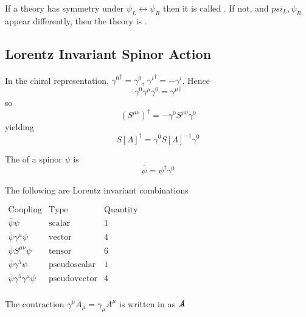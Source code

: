 \documentclass{article}
\begin{document}
\begin{definition}
If a theory has symmetry under $\psi_L \leftrightarrow \psi_R$ then it is called . If not, and $psi_L, \psi_R$ appear differently, then the theory is . 
\end{definition}

\subsection{Lorentz Invariant Spinor Action}

\begin{fact}
In the chiral representation, ${\gamma^0}^\dagger=\gamma^0$, ${\gamma^i}^\dagger=-\gamma^i$. Hence
\[
\gamma^0 \gamma^\mu \gamma^0={\gamma^\mu}^\dagger
\]
so 
\[
(S^{\mu\nu})^\dagger=-\gamma^0 S^{\mu\nu} \gamma^0
\]
yielding
\[
S[\Lambda]^\dagger=\gamma^0 S[\Lambda]^{-1} \gamma^0
\]
\end{fact}

\begin{definition}
The  of a spinor $\psi$ is 
\[
\bar{\psi}=\psi^\dagger \gamma^0
\]
\end{definition}

\begin{theorem}
The following are Lorentz invariant combinations
\begin{center}$
\begin{array}{ccc}
    \text{Coupling} & \text{Type} & \text{Quantity} \\
    \hline
    \hline
    \bar{\psi}\psi & \text{scalar} & 1 \\
    \bar{\psi}\gamma^\mu\psi & \text{vector} & 4 \\
    \bar{\psi} S^{\mu\nu} \psi & \text{tensor} & 6 \\
    \bar{\psi}\gamma^5\psi & \text{pseudoscalar} & 1 \\
    \bar{\psi}\gamma^5\gamma^\mu\psi & \text{pseudovector} & 4 \\
\end{array}
$\end{center}
\end{theorem}

\begin{definition}
The contraction $\gamma^\mu A_\mu=\gamma_\mu A^\mu$ is written in  as $\slashed{A}$
\end{definition}
\end{document}
